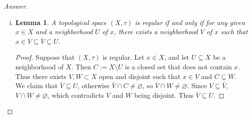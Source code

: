 \documentclass[12pt]{article}
\newcommand\paren[1]{\left( #1 \right)}
\newtheorem{lemma}[theorem]{Lemma}
\theoremstyle{definition}
\begin{document}
\begin{proof}[Answer]
\begin{enumerate}[(i)]
\begin{proof}
\begin{align*}
                & = Y \cap \paren{ X \setminus D }.
            \end{align*}
            Thus $Y \setminus \paren{ Y \cap D }$ is equal to the intersection of $Y$ with an open set, and so is open. Thus $Y \cap D$ is closed in $Y$.
        \end{proof}
        Let $(X,\tau)$ be a regular space, and let $Y \subseteq X$. Let $C \subset Y$ be closed, and let $y_0 \in Y \setminus C$. Then $C = Y \cap D$ for some $D \subseteq Y$ closed. Since $y_0 \notin C$, $y_0 \notin D$. Then there exists $U , V \in \tau$ disjoint such that $y_0 \in U$ and $D \subseteq V$. Then $U \cap Y$ is an open neighborhood of $y_0$ in $Y$, and since $C \subseteq Y$ and $C \subseteq D \subseteq V$., $V \cap Y$ is an open set in $Y$ that contains $C$. Since $y_0 \notin C$ and $C \subseteq V \cap Y$, $y_0 \notin V \cap Y$. Therefore $Y$ is regular.
        \item 
        \begin{lemma}
            A topological space $(X,\tau)$ is regular if and only if for any given $x \in X$ and a neighborhood $U$ of $x$, there exists a neighborhood $V$ of $x$ such that $x \in V \subseteq \overline{V} \subseteq U$.
        \end{lemma}
        \begin{proof}
            Suppose that $(X,\tau)$ is regular. Let $x \in X$, and let $U \subseteq X$ be a neighborhood of $X$. Then $C := X \setminus U$ is a closed set that does not contain $x$. Thus there exists $V , W \subset X$ open and disjoint such that $x \in V$ and $C \subseteq W$. We claim that $\overline{V} \subseteq U$, otherwise $\overline{V} \cap C \neq \varnothing$, so $\overline{V} \cap W \neq \varnothing$. Since $V \subseteq \overline{V}$, $V \cap W \neq \varnothing$, which contradicts $V$ and $W$ being disjoint. Thus $\overline{V} \subseteq U$.
        

\end{proof}
\end{enumerate}
\end{proof}
\end{document}

